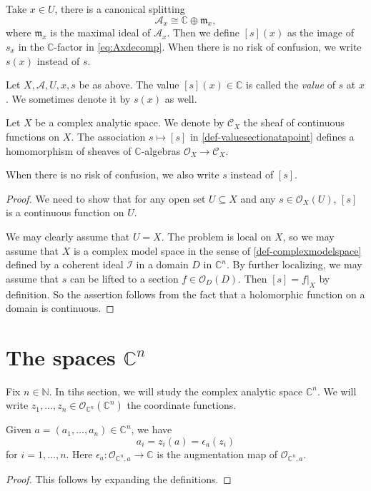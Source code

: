 Take $x\in U$, there is a canonical splitting
\begin{equation}\label{eq:Axdecomp}
  \mathcal{A}_{x}\cong \mathbb{C}\oplus \mathfrak{m}_{x}, 
\end{equation}
where $\mathfrak{m}_x$ is the maximal ideal of $\mathcal{A}_{x}$. Then we define $[s](x)$ as the image of $s_x$ in the $\mathbb{C}$-factor in \eqref{eq:Axdecomp}. When there is no risk of confusion, we write $s(x)$ instead of $s$.

\begin{definition}\label{def-valuesectionatapoint}
    Let $X,\mathcal{A},U,x,s$ be as above. The value $[s](x)\in \mathbb{C}$ is called the \emph{value} of $s$ at $x$. We sometimes denote it by $s(x)$ as well.
\end{definition}


\begin{lemma}
    Let $X$ be a complex analytic space. We denote by $\mathcal{C}_X$ the sheaf of continuous functions on $X$. 
    The association $s\mapsto [s]$ in \cref{def-valuesectionatapoint} defines a homomorphism of sheaves of $\mathbb{C}$-algebras $\mathcal{O}_X\rightarrow \mathcal{C}_X$. 
\end{lemma}
When there is no risk of confusion, we also write $s$ instead of $[s]$.
\begin{proof}
    We need to show that for any open set $U\subseteq X$ and any $s\in \mathcal{O}_X(U)$, $[s]$ is a continuous function on $U$. 
    
    We may clearly assume that $U=X$. The problem is local on $X$, so we may assume that $X$ is a complex model space in the sense of \cref{def-complexmodelspace} defined by a coherent ideal $\mathcal{I}$ in a domain $D$ in $\mathbb{C}^n$. By further localizing, we may assume that $s$ can be lifted to a section $f\in\mathcal{O}_D(D)$. Then $[s]=f|_X$ by definition. So the assertion follows from the fact that a holomorphic function on a domain is continuous.
\end{proof}

\section{The spaces \texorpdfstring{$\mathbb{C}^n$}{Cn}}
Fix $n\in \mathbb{N}$. In tihs section, we will study the complex analytic space $\mathbb{C}^n$. We will write $z_1,\ldots,z_n\in \mathcal{O}_{\mathbb{C}^n}(\mathbb{C}^n)$ the coordinate functions.

\begin{lemma}\label{lma-coorCnintermsaug}
    Given $a=(a_1,\ldots,a_n)\in \mathbb{C}^n$, we have
    \[
        a_i=z_i(a)=\epsilon_a(z_i)  
    \]
    for $i=1,\ldots,n$. Here $\epsilon_a:\mathcal{O}_{\mathbb{C}^n,a}\rightarrow \mathbb{C}$ is the augmentation map of $\mathcal{O}_{\mathbb{C}^n,a}$.
\end{lemma}
\begin{proof}
    This follows by expanding the definitions.
\end{proof}

